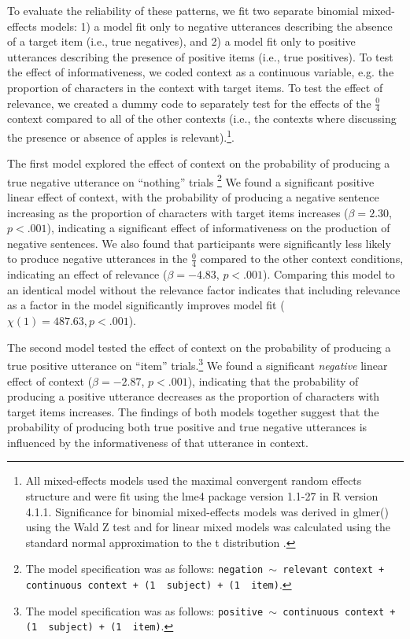 \documentclass[man, floatsintext, noapacite]{apa6}
\begin{document}
To evaluate the reliability of these patterns, we fit two separate binomial mixed-effects models: 1) a model fit only to negative utterances describing the absence of a target item (i.e., true negatives), and 2) a model fit only to positive utterances describing the presence of positive items (i.e., true positives). To test the effect of informativeness, we coded context as a continuous variable, e.g. the proportion of characters in the context with target items. To test the effect of relevance, we created a dummy code to separately test for the effects of the  $\frac{0}{4}$ context compared to all of the other contexts (i.e., the contexts where discussing the presence or absence of apples is relevant).\footnote{All mixed-effects models used the maximal convergent random effects structure \cite{barr2013} and were fit using the lme4 package version 1.1-27 in R version 4.1.1. Significance for binomial mixed-effects models was derived in glmer() using the Wald Z test and for linear mixed models was calculated using the standard normal approximation to the t distribution \cite{barr2013}.}.

The first model explored the effect of context on the probability of producing a true negative utterance on ``nothing'' trials \footnote{The model specification was as follows: \texttt{negation $\sim$  relevant context + continuous context + (1~\textbar~subject) +  (1~\textbar~item)}.} We found a significant positive linear effect of context, with the probability of producing a negative sentence increasing as the proportion of characters with target items increases ($\beta= 2.30$, $p< .001$), indicating a significant effect of informativeness on the production of negative sentences. We also found that participants were significantly less likely to produce negative utterances in the $\frac{0}{4}$ compared to the other context conditions, indicating an effect of relevance ($\beta= -4.83$, $p< .001$). Comparing this model to an identical model without the relevance factor indicates that including relevance as a factor in the model significantly improves model fit ($\chi(1)= 487.63, p < .001$). 

The second model tested the effect of context on the probability of producing a true positive utterance on ``item'' trials.\footnote{The model specification was as follows: \texttt{positive $\sim$  continuous context + (1~\textbar~subject) +  (1~\textbar~item)}.} We found a significant \textit{negative} linear effect of context ($\beta= -2.87$, $p< .001$), indicating that the probability of producing a positive utterance decreases as the proportion of characters with target items increases. The findings of both models together suggest that the probability of producing both true positive and true negative utterances is influenced by the informativeness of that utterance in context.
\end{document}
